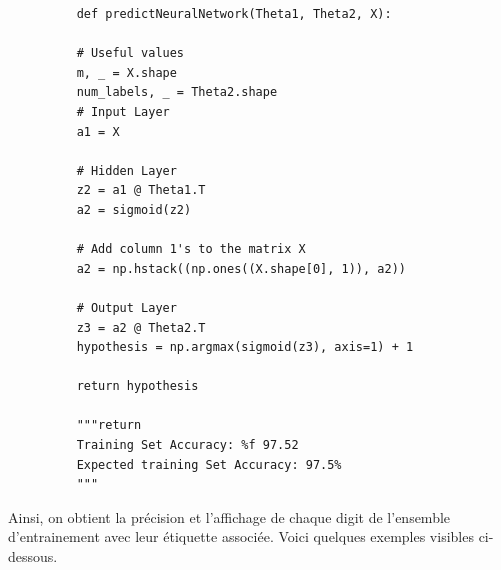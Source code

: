 \begin{figure}[!h]
    \begin{verbatim}
    def predictNeuralNetwork(Theta1, Theta2, X):

    # Useful values
    m, _ = X.shape
    num_labels, _ = Theta2.shape
    # Input Layer
    a1 = X

    # Hidden Layer
    z2 = a1 @ Theta1.T
    a2 = sigmoid(z2)
    
    # Add column 1's to the matrix X 
    a2 = np.hstack((np.ones((X.shape[0], 1)), a2))

    # Output Layer
    z3 = a2 @ Theta2.T
    hypothesis = np.argmax(sigmoid(z3), axis=1) + 1 
    
    return hypothesis

    """return 
    Training Set Accuracy: %f 97.52
    Expected training Set Accuracy: 97.5%
    """
    \end{verbatim}   
    \end{figure}

Ainsi, on obtient la précision et l'affichage de chaque digit de l'ensemble d'entrainement avec 
leur étiquette associée. Voici quelques exemples visibles ci-dessous. 


